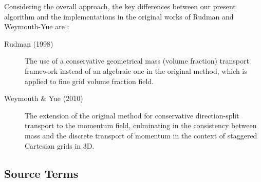 Considering the overall approach, the key differences between our present algorithm and the implementations in the original works of Rudman and Weymouth-Yue are : 

\begin{description}
	\item[Rudman (1998)\cite{rudman1998volume} ] The use of a conservative geometrical mass (volume fraction) transport framework instead of an algebraic one in the original method, which is applied to fine grid volume fraction field.  
	\item[Weymouth \& Yue (2010) \cite{weymouth2010conservative}] The extension of the original method for conservative direction-split transport to the momentum field, culminating in the consistency between mass and the discrete transport of momentum in the context of staggered Cartesian grids in 3D. 
\end{description}


\subsection*{Source Terms}

